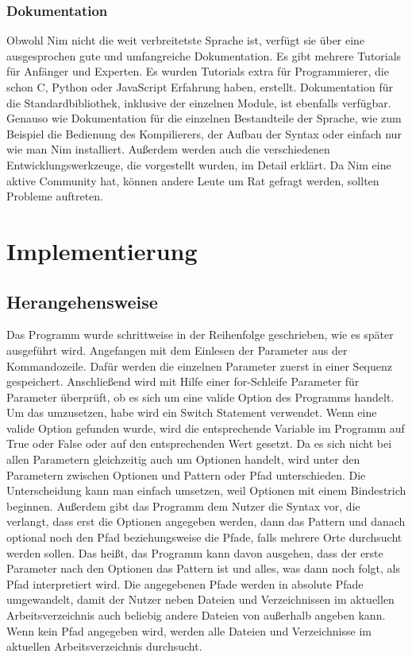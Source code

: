 \documentclass[11pt]{report}
\begin{document}
\subsection{Dokumentation}
Obwohl Nim nicht die weit verbreitetste Sprache ist, verfügt sie über eine ausgesprochen gute und umfangreiche Dokumentation.
Es gibt mehrere Tutorials für Anfänger und Experten. Es wurden Tutorials extra für Programmierer, die schon C, Python oder JavaScript Erfahrung haben, erstellt. Dokumentation für die Standardbibliothek, inklusive der einzelnen Module, ist ebenfalls verfügbar.
Genauso wie Dokumentation für die einzelnen Bestandteile der Sprache, wie zum Beispiel die Bedienung des Kompilierers, der Aufbau der Syntax oder einfach nur wie man Nim installiert.
Außerdem werden auch die verschiedenen Entwicklungswerkzeuge, die vorgestellt wurden, im Detail erklärt.
Da Nim eine aktive Community hat, können andere Leute um Rat gefragt werden, sollten Probleme auftreten.



\chapter{Implementierung}
\section{Herangehensweise}
Das Programm wurde schrittweise in der Reihenfolge geschrieben, wie es später ausgeführt wird. Angefangen mit dem Einlesen der Parameter aus der Kommandozeile. Dafür werden die einzelnen Parameter zuerst in einer Sequenz gespeichert. Anschließend wird mit Hilfe einer for-Schleife Parameter für Parameter überprüft, ob es sich um eine valide Option des Programms handelt. Um das umzusetzen, habe wird ein Switch Statement verwendet. Wenn eine valide Option gefunden wurde, wird die entsprechende Variable im Programm auf True oder False oder auf den entsprechenden Wert gesetzt. Da es sich nicht bei allen Parametern gleichzeitig auch um Optionen handelt, wird unter den Parametern zwischen Optionen und Pattern oder Pfad unterschieden. Die Unterscheidung kann man einfach umsetzen, weil Optionen mit einem Bindestrich beginnen. Außerdem gibt das Programm dem Nutzer die Syntax vor, die verlangt, dass erst die Optionen angegeben werden, dann das Pattern und danach optional noch den Pfad beziehungsweise die Pfade, falls mehrere Orte durchsucht werden sollen.
Das heißt, das Programm kann davon ausgehen, dass der erste Parameter nach den Optionen das Pattern ist und alles, was dann noch folgt, als Pfad interpretiert wird. Die angegebenen Pfade werden in absolute Pfade umgewandelt, damit der Nutzer neben Dateien und Verzeichnissen im aktuellen Arbeitsverzeichnis auch beliebig andere Dateien von außerhalb angeben kann. Wenn kein Pfad angegeben wird, werden alle Dateien und Verzeichnisse im aktuellen Arbeitsverzeichnis durchsucht.
\end{document}
